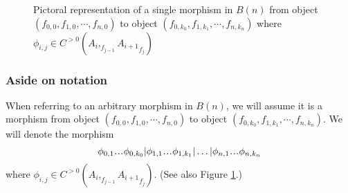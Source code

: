 \begin{figure}
\centerline{}
\caption{Pictoral representation of a single morphism in $B(n)$
from object $(f_{0,0}, f_{1,0}, \cdots, f_{n,0})$ to object 
$(f_{0,k_0}, f_{1,k_1}, \cdots, f_{n,k_n})$ where
$\phi_{i,j} \in C^{>0}(A_i, _{f_{j-1}}{A_{i+1}}_{f_j})$}
 \label{fig:phi}
\end{figure}

\subsubsection{Aside on notation} \label{sec:phi_notation}
When referring to an arbitrary morphism in $B(n)$,
we will assume it is a morphism from object $(f_{0,0}, f_{1,0}, \cdots, f_{n,0})$ 
to object $(f_{0,k_0}, f_{1,k_1}, \cdots, f_{n,k_n})$.
We will denote the morphism 
$$\phi_{0,1}\smdots\phi_{0,k_0} | 
\phi_{1,1}\smdots\phi_{1,k_1} | \dots |
\phi_{n,1}\smdots\phi_{n,k_n}$$ 
where $\phi_{i,j} \in C^{>0}(A_i, _{f_{j-1}}{A_{i+1}}_{f_j})$. 
(See also Figure \ref{fig:phi}.)
%
